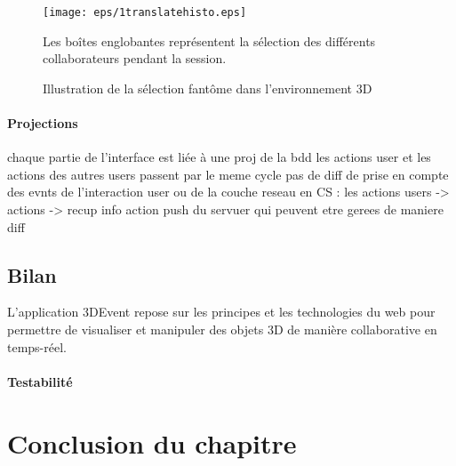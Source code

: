 \begin{figure}[ht]
	\centering
	\texttt{[image: eps/1translatehisto.eps]}
	\caption{Illustration de la sélection fantôme dans l'environnement 3D}{
		Les boîtes englobantes représentent la sélection des différents 
		collaborateurs pendant la session.
	}
	\label{fig:ghostselection}
\end{figure}

\paragraph{Projections}
chaque partie de l’interface est liée à une proj de la bdd
les actions user et les actions des autres users passent par le meme cycle
pas de diff de prise en compte des evnts de l’interaction user ou de la couche 
reseau
en CS : les actions users -> actions -> recup info
action push du servuer qui peuvent etre gerees de maniere diff
\subsection{Bilan}

L'application 3DEvent repose sur les principes et les 
technologies du web pour permettre de visualiser et manipuler des objets \gls{3D} 
de 
manière 
collaborative en temps-réel.
\paragraph{Testabilité}
\section{Conclusion du chapitre}